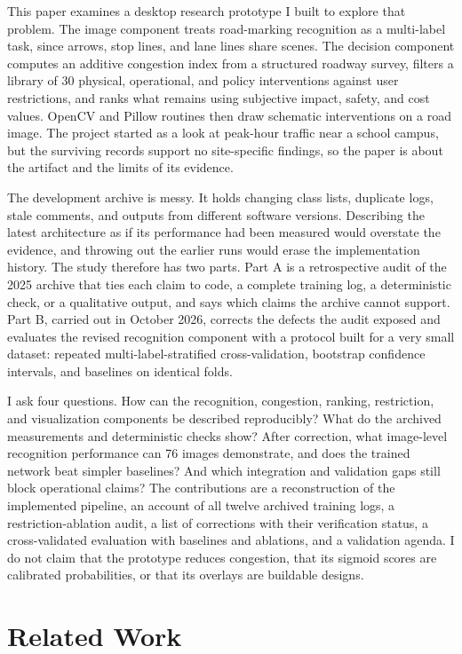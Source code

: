 \documentclass[11pt]{article}
\begin{document}
This paper examines a desktop research prototype I built to explore that problem. The image component treats road-marking recognition as a multi-label task, since arrows, stop lines, and lane lines share scenes. The decision component computes an additive congestion index from a structured roadway survey, filters a library of 30 physical, operational, and policy interventions against user restrictions, and ranks what remains using subjective impact, safety, and cost values. OpenCV and Pillow routines then draw schematic interventions on a road image. The project started as a look at peak-hour traffic near a school campus, but the surviving records support no site-specific findings, so the paper is about the artifact and the limits of its evidence.

The development archive is messy. It holds changing class lists, duplicate logs, stale comments, and outputs from different software versions. Describing the latest architecture as if its performance had been measured would overstate the evidence, and throwing out the earlier runs would erase the implementation history. The study therefore has two parts. Part A is a retrospective audit of the 2025 archive that ties each claim to code, a complete training log, a deterministic check, or a qualitative output, and says which claims the archive cannot support. Part B, carried out in October 2026, corrects the defects the audit exposed and evaluates the revised recognition component with a protocol built for a very small dataset: repeated multi-label-stratified cross-validation, bootstrap confidence intervals, and baselines on identical folds.

I ask four questions. How can the recognition, congestion, ranking, restriction, and visualization components be described reproducibly? What do the archived measurements and deterministic checks show? After correction, what image-level recognition performance can 76 images demonstrate, and does the trained network beat simpler baselines? And which integration and validation gaps still block operational claims? The contributions are a reconstruction of the implemented pipeline, an account of all twelve archived training logs, a restriction-ablation audit, a list of corrections with their verification status, a cross-validated evaluation with baselines and ablations, and a validation agenda. I do not claim that the prototype reduces congestion, that its sigmoid scores are calibrated probabilities, or that its overlays are buildable designs.

\section{Related Work}
\end{document}
